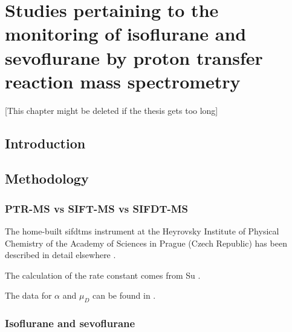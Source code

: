 

\chapter{Studies pertaining to the monitoring of isoflurane and sevoflurane by proton transfer reaction mass spectrometry}


[This chapter might be deleted if the thesis gets too long]


\section{Introduction}
\section{Methodology}
\subsection{PTR-MS vs SIFT-MS vs SIFDT-MS}





The home-built \acrshort{sifdtms} instrument at the Heyrovsky Institute of Physical Chemistry of the Academy of Sciences in Prague (Czech Republic) has been described in detail elsewhere \cite{doi:10.1021/acs.analchem.5b02994}.

The calculation of the rate constant comes from Su \cite{su1994parametrization}.

The data for $\alpha$ and $\mu_D$ can be found in \cite{lide2012crc}.







\subsection{Isoflurane and sevoflurane}

